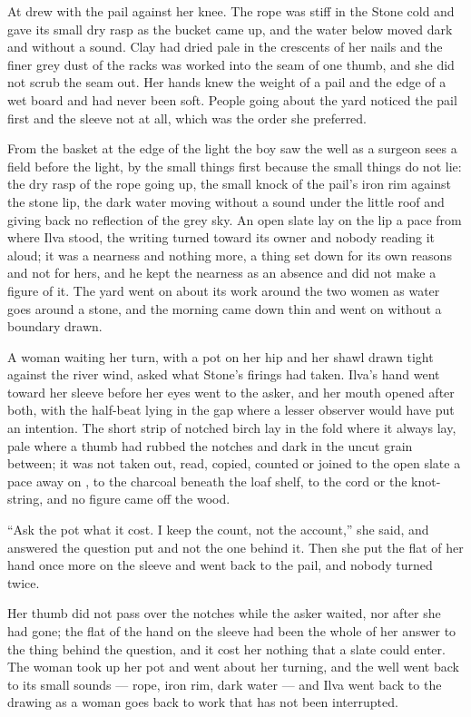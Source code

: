 At   drew with the pail against her knee. The rope was stiff in the Stone cold and gave its small dry rasp as the bucket came up, and the water below moved dark and without a sound. Clay had dried pale in the crescents of her nails and the finer grey dust of the racks was worked into the seam of one thumb, and she did not scrub the seam out. Her hands knew the weight of a pail and the edge of a wet board and had never been soft. People going about the yard noticed the pail first and the sleeve not at all, which was the order she preferred.

From the basket at the edge of the light the boy saw the well as a surgeon sees a field before the light, by the small things first because the small things do not lie: the dry rasp of the rope going up, the small knock of the pail's iron rim against the stone lip, the dark water moving without a sound under the little roof and giving back no reflection of the grey sky. An open slate lay on the lip a pace from where Ilva stood, the writing turned toward its owner and nobody reading it aloud; it was a nearness and nothing more, a thing set down for its own reasons and not for hers, and he kept the nearness as an absence and did not make a figure of it. The yard went on about its work around the two women as water goes around a stone, and the morning came down thin and went on without a boundary drawn.

A woman waiting her turn, with a pot on her hip and her shawl drawn tight against the river wind, asked what Stone's firings had taken. Ilva's hand went toward her sleeve before her eyes went to the asker, and her mouth opened after both, with the half-beat lying in the gap where a lesser observer would have put an intention. The short strip of notched birch lay in the fold where it always lay, pale where a thumb had rubbed the notches and dark in the uncut grain between; it was not taken out, read, copied, counted or joined to the open slate a pace away on , to the charcoal beneath the loaf shelf, to the cord or the knot-string, and no figure came off the wood.

“Ask the pot what it cost. I keep the count, not the account,” she said, and answered the question put and not the one behind it. Then she put the flat of her hand once more on the sleeve and went back to the pail, and nobody turned twice.

Her thumb did not pass over the notches while the asker waited, nor after she had gone; the flat of the hand on the sleeve had been the whole of her answer to the thing behind the question, and it cost her nothing that a slate could enter. The woman took up her pot and went about her turning, and the well went back to its small sounds --- rope, iron rim, dark water --- and Ilva went back to the drawing as a woman goes back to work that has not been interrupted.

